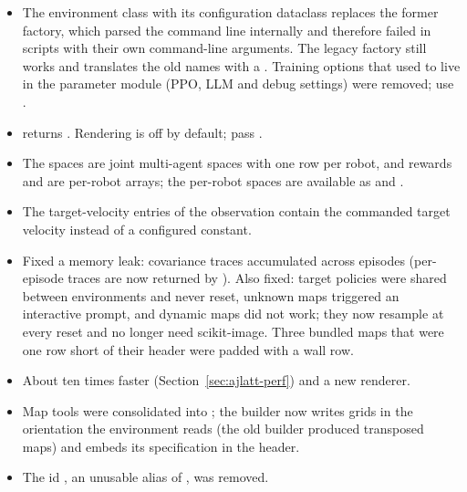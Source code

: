 \begin{itemize}
  \item The environment class  with its configuration
        dataclass  replaces the former factory, which parsed
        the command line internally and therefore failed in scripts with their
        own command-line arguments. The legacy factory
        still works and translates the old names with a
        . Training options that used to live in the
        parameter module (PPO, LLM and debug settings) were removed; use
        .
  \item {} returns . Rendering is off by
        default; pass .
  \item The spaces are joint multi-agent spaces with one row per robot, and
        rewards and  are per-robot arrays; the per-robot
        spaces are available as  and
        .
  \item The target-velocity entries of the observation contain the commanded
        target velocity instead of a configured constant.
  \item Fixed a memory leak: covariance traces accumulated across episodes
        (per-episode traces are now returned by ).
        Also fixed: target policies were shared between environments and never
        reset, unknown maps triggered an interactive prompt, and dynamic maps
        did not work; they now resample at every reset and no longer need
        scikit-image. Three bundled maps that were one row short of their header
        were padded with a wall row.
  \item About ten times faster (Section~\ref{sec:ajlatt-perf}) and a new
        renderer.
  \item Map tools were consolidated into ; the
        builder now writes grids in the orientation the environment reads (the
        old builder produced transposed maps) and embeds its specification in
        the header.
  \item The id , an unusable alias of , was
        removed.
\end{itemize}

\endgroup
